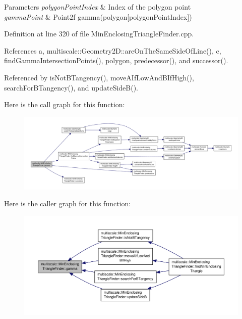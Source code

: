\begin{DoxyParams}{Parameters}
{\em polygon\-Point\-Index} & Index of the polygon point \\
\hline
{\em gamma\-Point} & Point2f gamma(polygon\mbox{[}polygon\-Point\-Index\mbox{]}) \\
\hline
\end{DoxyParams}


Definition at line 320 of file Min\-Enclosing\-Triangle\-Finder.\-cpp.



References a, multiscale\-::\-Geometry2\-D\-::are\-On\-The\-Same\-Side\-Of\-Line(), c, find\-Gamma\-Intersection\-Points(), polygon, predecessor(), and successor().



Referenced by is\-Not\-B\-Tangency(), move\-A\-If\-Low\-And\-B\-If\-High(), search\-For\-B\-Tangency(), and update\-Side\-B().



Here is the call graph for this function\-:\nopagebreak
\begin{figure}[H]
\begin{center}
\leavevmode
\includegraphics[width=350pt]{classmultiscale_1_1MinEnclosingTriangleFinder_a800413be1e1567d986a92fac4a6b937e_cgraph}
\end{center}
\end{figure}




Here is the caller graph for this function\-:\nopagebreak
\begin{figure}[H]
\begin{center}
\leavevmode
\includegraphics[width=350pt]{classmultiscale_1_1MinEnclosingTriangleFinder_a800413be1e1567d986a92fac4a6b937e_icgraph}
\end{center}
\end{figure}


